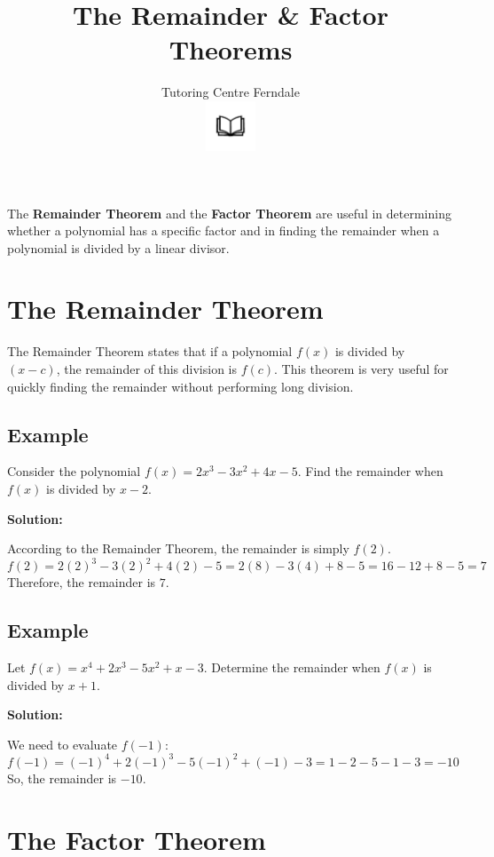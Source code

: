 \documentclass[12pt]{article}
\title{\textbf{The Remainder \& Factor Theorems}}
\author{Tutoring Centre Ferndale\\
\includegraphics[width=4em]{ApS_logo.png}}
\date{}
\begin{document}
\maketitle

The \textbf{Remainder Theorem} and the \textbf{Factor Theorem} are useful in determining whether a polynomial has a specific factor and in finding the remainder when a polynomial is divided by a linear divisor.

\section*{The Remainder Theorem}

The Remainder Theorem states that if a polynomial $f(x)$ is divided by $(x - c)$, the remainder of this division is $f(c)$. This theorem is very useful for quickly finding the remainder without performing long division.

\vfill

\subsection*{Example}

Consider the polynomial $f(x) = 2x^3 - 3x^2 + 4x - 5$. Find the remainder when $f(x)$ is divided by $x - 2$.

\textbf{Solution:}

According to the Remainder Theorem, the remainder is simply $f(2)$.
\[
f(2) = 2(2)^3 - 3(2)^2 + 4(2) - 5 = 2(8) - 3(4) + 8 - 5 = 16 - 12 + 8 - 5 = 7
\]
Therefore, the remainder is $7$.

\vfill

\newpage

\subsection*{Example}

Let $f(x) = x^4 + 2x^3 - 5x^2 + x - 3$. Determine the remainder when $f(x)$ is divided by $x + 1$.

\textbf{Solution:}

We need to evaluate $f(-1)$:
\[
f(-1) = (-1)^4 + 2(-1)^3 - 5(-1)^2 + (-1) - 3 = 1 - 2 - 5 - 1 - 3 = -10
\]
So, the remainder is $-10$.

\vfill

\section*{The Factor Theorem}
\end{document}
